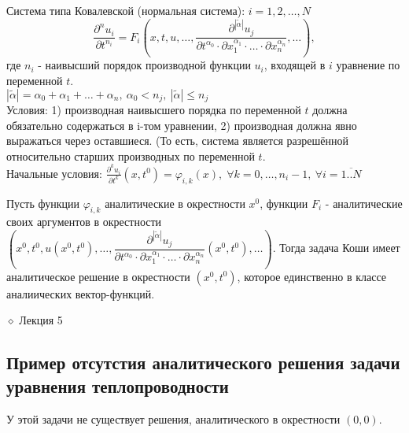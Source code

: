 \documentclass{article}
\begin{document}
Система типа Ковалевской (нормальная система):
$i=1,2,\dots,N$
$$
\dfrac{\partial^n u_i}{\partial t^{n_i}} = F_i(x,t,u,\dots,\dfrac{\partial^{|\tilde{\alpha}|} u_j}{\partial t^{\alpha_0} \cdot \partial x_1^{\alpha_1} \cdot \ldots \cdot \partial x_n^{\alpha_n}},\dots),
$$
где $n_i$ - наивысший порядок производной функции $u_i$, входящей в $i$ уравнение по переменной $t$. \\
$|\tilde{\alpha}|=\alpha_0 + \alpha_1 + \dots + \alpha_n, \ \alpha_0 < n_j, \ |\tilde{\alpha}| \le n_j$ \\
Условия: 1) производная наивысшего порядка по переменной $t$ должна обязательно содержаться в i-том уравнении, 2) производная должна явно выражаться через оставшиеся. (То есть, система является разрешённой относительно старших производных по переменной $t$. \\
\vspace{14}
Начальные условия: $\frac{\partial^k u_i}{\partial t^k}(x,t^0) = \varphi_{i,k}(x),\; \forall k=0,\dots,n_i-1,\ \forall i = \overline{1..N}$ \\

\begin{theorem}
Пусть функции $\varphi_{i,k}$ аналитические в окрестности $x^0$, функции $F_i$ - аналитические своих аргументов в окрестности $(x^0, t^0, u(x^0,t^0), \dots, \dfrac{\partial^{|\tilde{\alpha}|} u_j}{\partial t^{\alpha_0} \cdot \partial x_1^{\alpha_1} \cdot \ldots \cdot \partial x_n^{\alpha_n}}(x^0,t^0), \dots)$. Тогда задача Коши имеет аналитическое решение в окрестности $(x^0, t^0)$, которое единственно в классе аналиических вектор-функций. 
\end{theorem}

$\diamond$ Лекция 5

\subsection{Пример отсутстия аналитического решения задачи уравнения теплопроводности}
У этой задачи не существует решения, аналитического в окрестности $(0,0)$.
\end{document}
